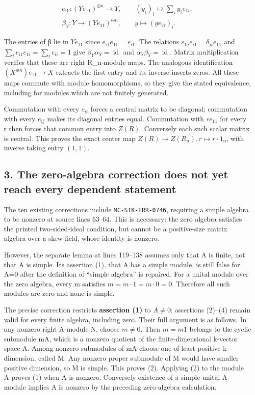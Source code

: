 \[\begin{gathered}
\alpha _{Y} : (Y e_{11})^{\oplus n} \to Y,\qquad (y_{i})_{i} \mapsto \sum _{i} y_{i} e_{1i},\\\beta _{Y} : Y \to (Y e_{11})^{\oplus n},\qquad y \mapsto (y e_{i1})_{i}.
\end{gathered}\]

The entries of β lie in \(Y e_{11}\) since \(e_{i1} e_{11}=e_{i1}\). The relations \(e_{1j} e_{i1}=\delta _{ji} e_{11}\) and \(\sum _{i} e_{i1} e_{1i}=\sum _{i} e_{ii}=1\) give \(\beta _{Y} \alpha _{Y}=\operatorname{id}\) and \(\alpha _{Y} \beta _{Y}=\operatorname{id}\). Matrix multiplication verifies that these are right R\_n-module maps. The analogous identification \((X^{\oplus n})e_{11}\to X\) extracts the first entry and its inverse inserts zeros. All these maps commute with module homomorphisms, so they give the stated equivalence, including for modules which are not finitely generated.

Commutation with every \(e_{ii}\) forces a central matrix to be diagonal; commutation with every \(e_{ij}\) makes its diagonal entries equal. Commutation with \(r e_{11}\) for every r then forces that common entry into \(Z(R)\). Conversely each such scalar matrix is central. This proves the exact center map \(Z(R)\to Z(R_{n}), r\mapsto r\cdot 1_{n}\), with inverse taking entry \((1,1)\).

\subsection{3. The zero-algebra correction does not yet reach every dependent statement}\label{the-zero-algebra-correction-does-not-yet-reach-every-dependent-statement}

The ten existing corrections include \texttt{MC-STK-ERR-0746}, requiring a simple algebra to be nonzero at source lines 63--64. This is necessary: the zero algebra satisfies the printed two-sided-ideal condition, but cannot be a positive-size matrix algebra over a skew field, whose identity is nonzero.

However, the separate lemma at lines 119--138 assumes only that A is finite, not that A is simple. Its assertion (1), that A has a simple module, is still false for A=0 after the definition of ``simple algebra'' is repaired. For a unital module over the zero algebra, every m satisfies \(m=m\cdot 1=m\cdot 0=0\). Therefore all such modules are zero and none is simple.

The precise correction restricts \textbf{assertion (1)} to \(A\ne 0\); assertions (2)--(4) remain valid for every finite algebra, including zero. Their full argument is as follows. In any nonzero right A-module N, choose \(m\ne 0\). Then \(m=m1\) belongs to the cyclic submodule mA, which is a nonzero quotient of the finite-dimensional k-vector space A. Among nonzero submodules of mA choose one of least positive k-dimension, called M. Any nonzero proper submodule of M would have smaller positive dimension, so M is simple. This proves (2). Applying (2) to the module A proves (1) when A is nonzero. Conversely existence of a simple unital A-module implies A is nonzero by the preceding zero-algebra calculation.

